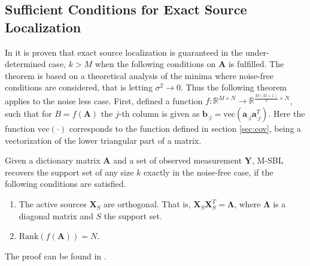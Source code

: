 \subsection{Sufficient Conditions for Exact Source Localization}
In \cite{Balkan2014} it is proven that exact source localization is guaranteed in the under-determined case, $k > M$ when the following conditions on $\mathbf{A}$ is fulfilled.
The theorem is based on a theoretical analysis of the minima where noise-free conditions are considered, that is letting $\sigma^2 \rightarrow 0$. Thus the following theorem applies to the noise less case.   
First, defined a function $f:\mathbb{R}^{M \times N} \rightarrow \mathbb{R}^{\frac{M(M+1)}{2}\times N}$, such that for $B = f(\mathbf{A})$ the $j$-th column is given as $\mathbf{b}_{\cdot j} = \text{vec}(\mathbf{a}_{\cdot j}\mathbf{a}_{\cdot j}^T)$. Here the function $\text{vec}(\cdot)$ corresponds to the function defined in section \ref{sec:cov}, being a vectorization of the lower triangular part of a matrix.	
\begin{theorem}
Given a dictionary matrix $\mathbf{A}$ and a set of observed measurement $\mathbf{Y}$, M-SBL recovers the support set of any size $k$ exactly in the noise-free case, if the following conditions are satisfied. 
\begin{enumerate}
\item The active sources $\mathbf{X}_S$ are orthogonal. That is, $\mathbf{X}_S \mathbf{X}_S^T = \boldsymbol{\Lambda}$, where $\boldsymbol{\Lambda}$ is a diagonal matrix and $S$ the support set.
\item $\text{Rank}(f(\mathbf{A}))= N$.
\end{enumerate}
The proof can be found in \cite[p. 16]{Balkan2014}.


\label{th:conditions}
\end{theorem}  

